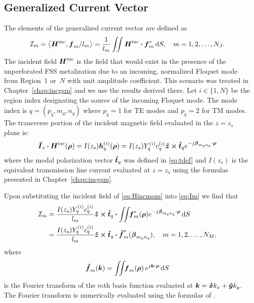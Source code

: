 \subsection{\label{subsec:gcm}Generalized Current Vector}
The elements of the generalized current vector are defined as 
\begin{equation}
  \mathcal{I}_m =  \left< \boldsymbol{H}^{\text{inc}}, \boldsymbol{f}_m/l_m \right> = \frac{1}{l_m} 
  \iint \boldsymbol{H}^{\text{inc}} \boldsymbol{\cdot} \boldsymbol{f}_m^* \, \text{d} S, \quad
  m = 1, 2, \ldots,  N_J.  
  \label{eq:Im}
\end{equation}
The incident field $\boldsymbol{H}^{\text{inc}}$ is the field that would exist in the
presence of the unperforated FSS metalization due to an incoming, normalized
Floquet mode from Region~$1$ or~$N$ with unit amplitude coefficient.
This scenario was treated in Chapter~\ref{chap:incgsm} and we use the results
derived there.  Let $i \in \{1,N\}$ be the region index designating
the source of the incoming Floquet mode.  The mode index is $q =
(p_q,m_q,n_q)$ where $p_q=1$ for TE modes and $p_q=2$ for TM modes.  The
transverse portion of the incident magnetic field evaluated in the
$z=z_s$ plane is:
\begin{equation}
  \boldsymbol{\bar{I}}_z \boldsymbol{\cdot} \boldsymbol{H}^{\text{inc}}(\boldsymbol{\rho}) = I(z_s) \boldsymbol{h}_q^{(i)}(\boldsymbol{\rho})
  = I(z_s) Y_q^{(i)} c_q^{(i)} \boldsymbol{\hat{z}}\boldsymbol{\times}\boldsymbol{\hat{t}}_q e^{-j\boldsymbol{\beta}_{m_q n_q} \boldsymbol{\cdot}
  \boldsymbol{\rho}} \label{eq:Hincmom}
\end{equation}
where the modal polarization vector $\boldsymbol{\hat{t}}_q$ was defined in \eqref{eq:tdef}
and $I(z_s)$ is the equivalent transmission line current evaluated at
$z=z_s$ using the formulas presented in Chapter~\ref{chap:incgsm}.

Upon substituting the incident field of \eqref{eq:Hincmom} into
\eqref{eq:Im} we find that
\begin{align}
  \mathcal{I}_m &=  
  \frac{I(z_s) Y_q^{(i)} c_q^{(i)}}{l_m} \boldsymbol{\hat{z}} \boldsymbol{\times} \boldsymbol{\hat{t}}_q \boldsymbol{\cdot} 
  \iint \! \! \boldsymbol{f}_m^*(\boldsymbol{\rho}) e^{-j\boldsymbol{\beta}_{m_q n_q}\boldsymbol{\cdot}\boldsymbol{\rho}} \, \text{d} S 
  \nonumber \\
  &= 
  \frac{I(z_s) Y_q^{(i)} c_q^{(i)}}{l_m} \boldsymbol{\hat{z}} \boldsymbol{\times}  \boldsymbol{\hat{t}}_q \boldsymbol{\cdot} 
  \boldsymbol{\tilde{f}}_m^*(\boldsymbol{\beta}_{m_q n_q}), \quad
  m = 1, 2, \ldots,  N_M,  
\end{align}
where
\begin{equation}
    \boldsymbol{\tilde{f}}_m(\boldsymbol{k}) = \iint \!\!
    \boldsymbol{f}_m(\boldsymbol{\rho}) \, e^{j\boldsymbol{k} \boldsymbol{\cdot} \boldsymbol{\rho}} \, \text{d} S 
\end{equation}
is the Fourier transform of the $m$th basis function evaluated at $\boldsymbol{k}
= \boldsymbol{\hat{x}} k_x + \boldsymbol{\hat{y}} k_y.$  The Fourier transform is numerically
evaluated using the formulas of \cite{mcsi:91}.
